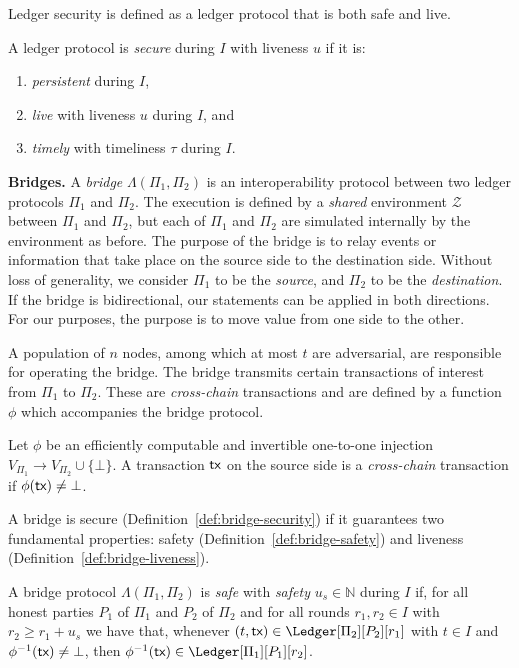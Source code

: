 Ledger security is defined as a ledger protocol that is both safe and live.

\begin{definition}[Security]
  A ledger protocol is \emph{secure} during $I$ with liveness $u$ if it is:

  \begin{enumerate}
    \item \emph{persistent} during $I$,
    \item \emph{live} with liveness $u$ during $I$, and
    \item \emph{timely} with timeliness $\tau$ during $I$.
  \end{enumerate}
\end{definition}

\noindent
\textbf{Bridges.}
A \emph{bridge} $\Lambda(\Pi_1, \Pi_2)$ is an interoperability protocol between two ledger protocols
$\Pi_1$ and $\Pi_2$. The execution is defined by a \emph{shared} environment $\mathcal{Z}$ between $\Pi_1$
and $\Pi_2$, but each of $\Pi_1$ and $\Pi_2$ are simulated internally by the environment as before.
The purpose of the bridge is to relay events or information that take place on the source
side to the destination side. Without loss of generality, we consider $\Pi_1$ to be the \emph{source},
and $\Pi_2$ to be the \emph{destination}. If the bridge is bidirectional, our statements can be
applied in both directions. For our purposes, the purpose is to move value from one side to
the other.

A population of $n$ nodes, among which at most $t$ are adversarial, are
responsible for operating the bridge. The bridge transmits certain transactions
of interest from $\Pi_1$ to $\Pi_2$. These are \emph{cross-chain} transactions
and are defined by a function $\phi$ which accompanies the bridge protocol.

\begin{definition}
  Let $\phi$ be an efficiently computable and invertible one-to-one
  injection $V_{\Pi_1} \longrightarrow V_{\Pi_2} \cup \{ \bot \}$.
  A transaction $\textsf{tx}$ on the source side is a \emph{cross-chain} transaction if
  $\phi(\textsf{tx}) \neq \bot$.
\end{definition}

A bridge is secure (Definition~\ref{def:bridge-security}) if it guarantees two fundamental properties:
safety (Definition~\ref{def:bridge-safety}) and liveness (Definition~\ref{def:bridge-liveness}).

\begin{definition}\label{def:bridge-safety}
  A bridge protocol $\Lambda(\Pi_1, \Pi_2)$ is \emph{safe} with \emph{safety} $u_s \in \mathbb{N}$
  during $I$ if, for all honest parties $P_1$ of $\Pi_1$ and $P_2$ of $\Pi_2$ and for all rounds
  $r_1, r_2 \in I$ with $r_2 \geq r_1 + u_s$ we have that, whenever $(t, \tx) \in \Ledger[\Pi_2][P_2][r_1]$
  with $t \in I$ and $\phi^{-1}(\textsf{tx}) \neq \bot$, then
  $\phi^{-1}(\tx) \in \Ledger[\Pi_1][P_1][r_2]$.
\end{definition}

